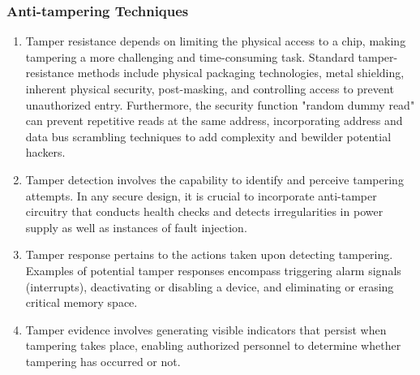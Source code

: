 \subsubsection{Anti-tampering Techniques}
\begin{enumerate}
	\item Tamper resistance depends on limiting the physical access to a chip, making tampering a more challenging and time-consuming task. Standard tamper-resistance methods include physical packaging technologies, metal shielding, inherent physical security, post-masking, and controlling access to prevent unauthorized entry. Furthermore, the security function "random dummy read" can prevent repetitive reads at the same address, incorporating address and data bus scrambling techniques to add complexity and bewilder potential hackers.
	\item Tamper detection involves the capability to identify and perceive tampering attempts. In any secure design, it is crucial to incorporate anti-tamper circuitry that conducts health checks and detects irregularities in power supply as well as instances of fault injection.
	\item Tamper response pertains to the actions taken upon detecting tampering. Examples of potential tamper responses encompass triggering alarm signals (interrupts), deactivating or disabling a device, and eliminating or erasing critical memory space.
	\item Tamper evidence involves generating visible indicators that persist when tampering takes place, enabling authorized personnel to determine whether tampering has occurred or not.
\end{enumerate}








